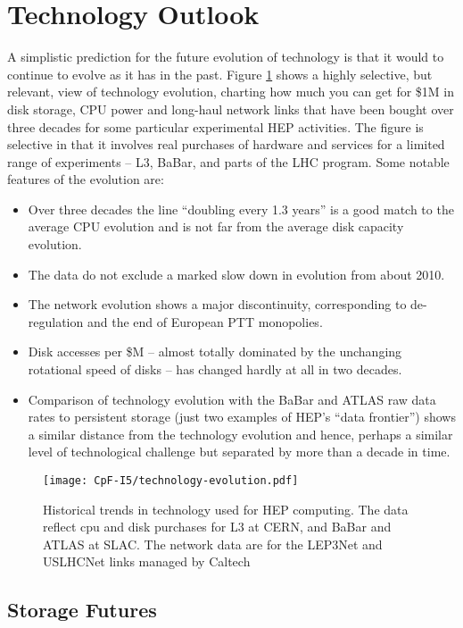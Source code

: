\section{Technology Outlook}
\label{sec:cpfi5-technology}
A simplistic prediction for the future evolution of technology is that it 
would to continue to 
evolve as it has in the past.  Figure \ref{fig:technology-evolution} shows a highly selective, but relevant, 
view of technology evolution, charting how much you can get for \$1M in disk storage, 
CPU power and long-haul network links that have been bought over three decades 
for some particular experimental HEP activities.  The figure is  selective in that 
it involves real purchases of hardware and services for a limited range of 
experiments -- L3, BaBar, and parts of the LHC program. Some notable features of the 
evolution are:
\begin{itemize}
\item
Over three decades the line ``doubling every 1.3 years'' is a good match to the average 
CPU evolution and is not far from the average disk capacity evolution.
\item
The data do not exclude a marked slow down in evolution from about 2010.
\item
The network evolution shows a major discontinuity, corresponding to de-regulation 
and the end of European PTT monopolies.
\item
Disk accesses per \$M -- almost totally dominated by the unchanging rotational 
speed of disks -- has changed hardly at all in two decades.
\item
Comparison of technology evolution with the BaBar and ATLAS raw data rates to 
persistent storage (just two examples of HEP's ``data frontier'') shows a similar 
distance from the technology evolution and hence, perhaps a similar level of 
technological challenge but separated by more than a decade in time. 
\end{itemize}

\begin{figure}[h]
\centering
\texttt{[image: CpF-I5/technology-evolution.pdf]}
\caption{Historical trends in technology used for HEP computing.  The data reflect cpu and disk purchases for L3 at CERN, and BaBar and ATLAS at SLAC.  The network data are for the LEP3Net and USLHCNet links managed by Caltech}
\label{fig:technology-evolution}
\end{figure}


\subsection{Storage Futures}
